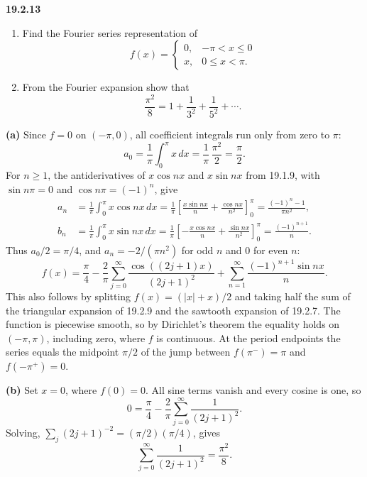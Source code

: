 \par\bigskip
\noindent\textbf{19.2.13}
\begin{enumerate}
\item[(a)] Find the Fourier series representation of
\[
f(x)=\begin{cases}
0, & -\pi<x\le0\\
x, & 0\le x<\pi.
\end{cases}
\]
\item[(b)] From the Fourier expansion show that
\[
\frac{\pi^{2}}{8}=1+\frac{1}{3^{2}}+\frac{1}{5^{2}}+\cdots.
\]
\end{enumerate}
\solution
\textbf{(a)} Since $f=0$ on $(-\pi,0)$, all coefficient integrals run
only from zero to $\pi$:
\[
a_0=\frac1\pi\int_0^\pi x\,dx=\frac1\pi\,\frac{\pi^2}2=\frac\pi2.
\]
For $n\ge1$, the antiderivatives of $x\cos nx$ and $x\sin nx$ from
19.1.9, with $\sin n\pi=0$ and $\cos n\pi=(-1)^n$, give
\begin{align*}
a_n&=\frac1\pi\int_0^\pi x\cos nx\,dx
=\frac1\pi\left[\frac{x\sin nx}{n}
+\frac{\cos nx}{n^2}\right]_0^\pi
=\frac{(-1)^n-1}{\pi n^2},\\
b_n&=\frac1\pi\int_0^\pi x\sin nx\,dx
=\frac1\pi\left[-\frac{x\cos nx}{n}
+\frac{\sin nx}{n^2}\right]_0^\pi
=\frac{(-1)^{n+1}}n.
\end{align*}
Thus $a_0/2=\pi/4$, and $a_n=-2/(\pi n^2)$ for odd $n$ and $0$ for even
$n$:
\[
\boxed{f(x)=\frac\pi4-\frac2\pi\sum_{j=0}^{\infty}
\frac{\cos((2j+1)x)}{(2j+1)^2}
+\sum_{n=1}^{\infty}\frac{(-1)^{n+1}\sin nx}{n}.}
\]
This also follows by splitting $f(x)=(|x|+x)/2$ and taking half the sum
of the triangular expansion of 19.2.9 and the sawtooth expansion of
19.2.7. The function is piecewise smooth, so by Dirichlet's theorem the
equality holds on $(-\pi,\pi)$, including zero, where $f$ is continuous.
At the period endpoints the series equals the midpoint $\pi/2$ of the
jump between $f(\pi^-)=\pi$ and $f(-\pi^+)=0$.

\textbf{(b)} Set $x=0$, where $f(0)=0$. All sine terms vanish and every
cosine is one, so
\[
0=\frac\pi4-\frac2\pi\sum_{j=0}^{\infty}\frac1{(2j+1)^2}.
\]
Solving, $\sum_j(2j+1)^{-2}=(\pi/2)(\pi/4)$, gives
\[
\boxed{\sum_{j=0}^{\infty}\frac1{(2j+1)^2}=\frac{\pi^2}{8}.}
\]

